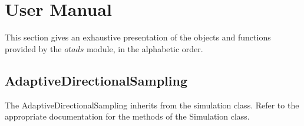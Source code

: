 % 

\section{User Manual}

This section gives an exhaustive presentation of the objects and functions provided by the $otads$ module, in the alphabetic order.


\subsection{AdaptiveDirectionalSampling}

The AdaptiveDirectionalSampling inherits from the simulation class. Refer to the appropriate documentation for the methods of the Simulation class.


